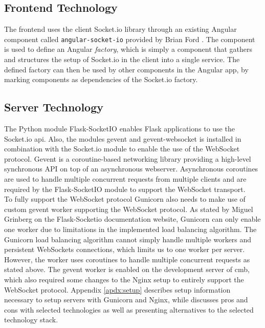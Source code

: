 \subsection{Frontend Technology}
\label{sub-sec:real-time-frontend}
The frontend uses the client Socket.io library \cite{SOCKETIO} through an existing Angular component called \texttt{angular-socket-io} provided by Brian Ford \cite{ANGULARSOCKETIO}. The component is used to define an Angular \textit{factory}, which is simply a component that gathers and structures the setup of Socket.io in the client into a single service. The defined factory can then be used by other components in the Angular app, by marking components as dependencies of the Socket.io factory. \\

\subsection{Server Technology}
\label{sub-sec:real-time-server}
The Python module Flask-SocketIO \cite{FLASKSOCKETIO} enables Flask applications to use the Socket.io \gls{api}. Also, the modules gevent \cite{GEVENT} and gevent-websocket \cite{GEVENTWEBSOCKET}  is installed in combination with the Socket.io module to enable the use of the WebSocket protocol. Gevent is a coroutine-based networking library providing a high-level synchronous API on top of an asynchronous webserver. Asynchronous coroutines are used to handle multiple concurrent requests from multiple clients and are required by the Flask-SocketIO module to support the WebSocket transport. \\

To fully support the WebSocket protocol Gunicorn also needs to make use of custom gevent worker supporting the WebSocket protocol. As stated by Miguel Grinberg on the Flask-Socketio documentation website, Gunicorn can only enable one worker due to limitations in the implemented load balancing algorithm. The Gunicorn load balancing algorithm cannot simply handle multiple workers and persistent WebSockets connections, which limits us to one worker per server. However, the worker uses coroutines to handle multiple concurrent requests as stated above. The gevent worker is enabled on the development server of \gls{cmb}, which also required some changes to the Nginx setup to entirely support the WebSocket protocol. Appendix \ref{apdx:setup} describes setup information necessary to setup servers with Gunicorn and Nginx, while  discusses pros and cons with selected technologies as well as presenting alternatives to the selected technology stack.

